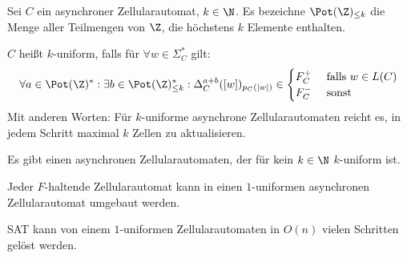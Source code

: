 \begin{definition}[$k$-uniform]
    Sei $C$ ein asynchroner Zellularautomat, $k \in \N$.
    Es bezeichne $\Pot(\Z)_{\leq k}$ die Menge aller Teilmengen von $\Z$, die höchstens $k$ Elemente enthalten.
    
    $C$ heißt $k$-uniform, falls für $\forall w \in \Sigma_C^*$ gilt:
    \[
        \forall a \in \Pot({\Z})^*: \exists b \in \Pot({\Z})_{\leq k}^*:
            \Delta^{a+b}_C([w])_{{p_C}(|w|)} \in
            \begin{cases}
                F_C^+ & \text{ falls } w \in L(C) \\ 
                F_C^- & \text{ sonst }
            \end{cases}
    \]
    Mit anderen Worten: Für $k$-uniforme asynchrone Zellularautomaten reicht es, in jedem Schritt maximal
    $k$ Zellen zu aktualisieren.
\end{definition}

\begin{satz}
    Es gibt einen asynchronen Zellularautomaten, der für kein $k \in \N$ $k$-uniform ist.
\end{satz}

\begin{satz}
    Jeder $F$-haltende Zellularautomat kann in einen $1$-uniformen asynchronen Zellularautomat umgebaut werden.
\end{satz}

\begin{satz}
    SAT kann von einem $1$-uniformen Zellularautomaten in $O(n)$ vielen Schritten gelöst werden.
\end{satz}
